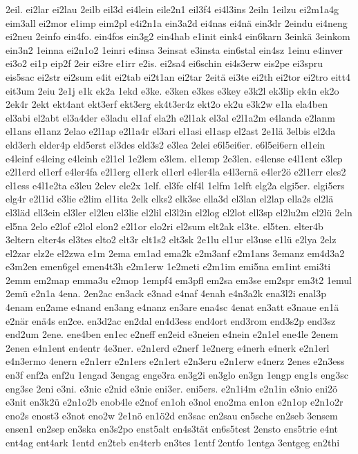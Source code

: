 {2eil.
ei2lar
ei2lau
2eilb
eil3d
ei4lein
eile2n1
eil3f4
ei4l3ins
2eiln
1eilzu
ei2m1a4g
eim3all
ei2mor
e1imp
eim2pl
e4i2n1a
ein3a2d
ei4nas
ei4nä
ein3dr
2eindu
ei4neng
ei2neu
2einfo
ein4fo.
ein4fos
ein3g2
ein4hab
e1init
eink4
ein6karn
3einkä
3einkom
ein3n2
1einna
ei2n1o2
1einri
e4insa
3einsat
e3insta
ein6stal
ein4sz
1einu
e4inver
ei3o2
ei1p
eip2f
2eir
ei3re
e1irr
e2is.
ei2sa4
ei6schin
ei4s3erw
eis2pe
ei3spru
eis5sac
ei2str
ei2sum
e4it
ei2tab
ei2t1an
ei2tar
2eitä
ei3te
ei2th
ei2tor
ei2tro
eitt4
eit3um
2eiu
2e1j
e1k
ek2a
1ekd
e3ke.
e3ken
e3kes
e3key
e3k2l
ek3lip
ek4n
ek2o
2ek4r
2ekt
ekt4ant
ekt3erf
ekt3erg
ek4t3er4z
ekt2o
ek2u
e3k2w
e1la
ela4ben
el3abi
el2abt
el3a4der
e3ladu
el1af
ela2h
e2l1ak
el3al
e2l1a2m
e4landa
e2lanm
el1ans
el1anz
2elao
e2l1ap
e2l1a4r
el3ari
el1asi
el1asp
el2ast
2e1lä
3elbis
el2da
eld3erh
elder4p
eld5erst
el3des
eld3s2
e3lea
2elei
e6l5ei6er.
e6l5ei6ern
el1ein
e4leinf
e4leing
e4leinh
e2l1el
1e2lem
e3lem.
el1emp
2e3len.
e4lense
e4l1ent
e3lep
e2l1erd
el1erf
e4ler4fa
e2l1erg
el1erk
el1erl
e4ler4la
e4l3ernä
e4ler2ö
e2l1err
eles2
el1ess
e4l1e2ta
e3leu
2elev
ele2x
1elf.
el3fe
elf4l
1elfm
1elft
elg2a
elgi5er.
elgi5ers
elg4r
e2l1id
e3lie
e2lim
el1ita
2elk
elks2
elk3sc
ella3d
el3lan
el2lap
ella2s
el2lä
el3läd
ell3ein
el3ler
el2leu
el3lie
el2lil
el3l2in
el2log
el2lot
ell3sp
el2lu2m
el2lü
2eln
el5na
2elo
e2lof
e2lol
elon2
e2l1or
elo2ri
el2sum
elt2ak
el3te.
el5ten.
elter4b
3eltern
elter4s
el3tes
elto2
elt3r
elt1s2
elt3sk
2e1lu
el1ur
el3use
e1lü
e2lya
2elz
el2zar
elz2e
el2zwa
e1m
2ema
em1ad
ema2k
e2m3anf
e2m1ans
3emanz
em4d3a2
e3m2en
emen6gel
emen4t3h
e2m1erw
1e2meti
e2m1im
emi5na
em1int
emi3ti
2emm
em2map
emma3u
e2mop
1empf4
em3pfl
em2sa
em3se
em2spr
em3t2
1emul
2emü
e2n1a
4ena.
2en2ac
en3ack
e3nad
e4naf
4enah
e4n3a2k
ena3l2i
enal3p
4enam
en2ame
e4nand
en3ang
e4nanz
en3are
ena4sc
4enat
en3att
e3naue
en1ä
e2när
enä4s
en2ce.
en3d2ac
en2dal
en4d3ess
end4ort
end3rom
end3s2p
end3sz
end2um
2ene.
ene4ben
en1ec
e2neff
en2eid
e3neien
e4nein
e2n1el
ene4le
2enem
2enen
e4n1ent
en4entr
4e3ner.
e2n1erd
e2nerf
1e2nerg
e4nerh
e4nerk
e2n1erl
e4n3ermo
4enern
e2n1err
e2n1ers
e2n1ert
e2n3eru
e2n1erw
e4nerz
2enes
e2n3ess
en3f
enf2a
enf2u
1engad
3engag
enge3ra
en3g2i
en3glo
en3gn
1engp
eng1s
eng3sc
eng3se
2eni
e3ni.
e3nic
e2nid
e3nie
eni3er.
eni5ers.
e2n1i4m
e2n1in
e3nio
eni2ö
e3nit
en3k2ü
e2n1o2b
enob4le
e2nof
en1oh
e3nol
eno2ma
en1on
e2n1op
e2n1o2r
eno2s
enost3
e3not
eno2w
2e1nö
en1ö2d
en3sac
en2sau
en5sche
en2seb
3ensem
ensen1
en2sep
en3ska
en3s2po
enst5alt
en4s3tät
en6s5test
2ensto
ens5trie
e4nt
ent4ag
ent4ark
1entd
en2teb
en4terb
en3tes
1entf
2entfo
1entga
3entgeg
en2thi
}
